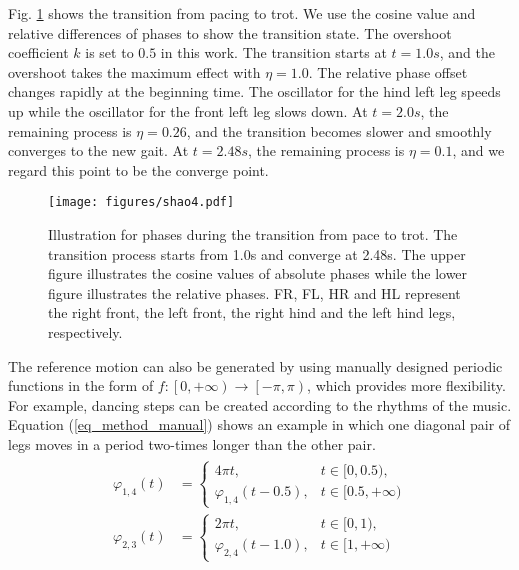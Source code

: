 \documentclass[letterpaper, 10 pt, journal, twoside]{IEEEtran} %
\begin{document}
Fig. \ref{method_5} shows the transition from pacing to trot. We use the cosine value and relative differences of phases to show the transition state. The overshoot coefficient $k$ is set to $0.5$ in this work. The transition starts at $t=1.0s$, and the overshoot takes the maximum effect with $\eta=1.0$. The relative phase offset changes rapidly at the beginning time. The oscillator for the hind left leg speeds up while the oscillator for the front left leg slows down. At $t=2.0s$, the remaining process is $\eta=0.26$, and the transition becomes slower and smoothly converges to the new gait. At $t=2.48s$, the remaining process is $\eta=0.1$, and we regard this point to be the converge point. 
\begin{figure}[!t]
	\centering
	\texttt{[image: figures/shao4.pdf]}
	\caption{Illustration for phases during the transition from pace to trot. The transition process starts from 1.0s and converge at 2.48s. The upper figure illustrates the cosine values of absolute phases while the lower figure illustrates the relative phases. FR, FL, HR and HL represent the right front, the left front, the right hind and the left hind legs, respectively.}
	\label{method_5}
\end{figure}

The reference motion can also be generated by using manually designed periodic functions in the form of $f:\left[0, +\infty\right)\rightarrow \left[-\pi,\pi\right)$, which provides more flexibility. For example, dancing steps can be created according to the rhythms of the music. Equation (\ref{eq_method_manual}) shows an example in which one diagonal pair of legs moves in a period two-times longer than the other pair. 
\begin{eqnarray}
	\label{eq_method_manual}
	\begin{aligned}
		\varphi_{1,4}\left(t\right)&=
		\begin{cases}
			4\pi t, &t\in[0, 0.5),\\
			\varphi_{1,4}\left(t-0.5\right), &t\in[0.5, +\infty)
		\end{cases} \\
		\varphi_{2,3}\left(t\right)&=
		\begin{cases}
			2\pi t, &t\in[0, 1),\\
			\varphi_{2,4}\left(t-1.0\right), &t\in[1, +\infty)
		\end{cases} \\
	\end{aligned}
\end{eqnarray}
\end{document}
